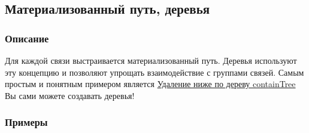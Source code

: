 \subsection{Материализованный путь, деревья}
\subsubsection{Описание}
Для каждой связи выстраивается материализованный путь. Деревья используют эту
концепцию и позволяют упрощать взаимодействие с группами связей.
Самым простым и понятным примером является
\hyperlink{containTree.Deletion.Example}{Удаление ниже по дереву containTree}
Вы сами можете создавать деревья!
\subsubsection{Примеры}
